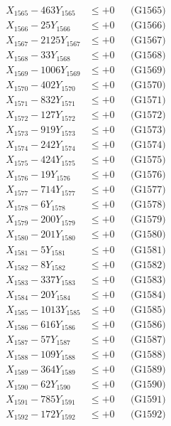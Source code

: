 \documentclass[a4paper,10pt]{article}
\begin{document}
{\begin{align}
X_{1565} - 463Y_{1565} &\leq +0 && \text{(G1565)} \\
X_{1566} - 25Y_{1566} &\leq +0 && \text{(G1566)} \\
X_{1567} - 2125Y_{1567} &\leq +0 && \text{(G1567)} \\
X_{1568} - 33Y_{1568} &\leq +0 && \text{(G1568)} \\
X_{1569} - 1006Y_{1569} &\leq +0 && \text{(G1569)} \\
X_{1570} - 402Y_{1570} &\leq +0 && \text{(G1570)} \\
\allowbreak
X_{1571} - 832Y_{1571} &\leq +0 && \text{(G1571)} \\
X_{1572} - 127Y_{1572} &\leq +0 && \text{(G1572)} \\
X_{1573} - 919Y_{1573} &\leq +0 && \text{(G1573)} \\
X_{1574} - 242Y_{1574} &\leq +0 && \text{(G1574)} \\
X_{1575} - 424Y_{1575} &\leq +0 && \text{(G1575)} \\
X_{1576} - 19Y_{1576} &\leq +0 && \text{(G1576)} \\
X_{1577} - 714Y_{1577} &\leq +0 && \text{(G1577)} \\
X_{1578} - 6Y_{1578} &\leq +0 && \text{(G1578)} \\
X_{1579} - 200Y_{1579} &\leq +0 && \text{(G1579)} \\
X_{1580} - 201Y_{1580} &\leq +0 && \text{(G1580)} \\
\allowbreak
X_{1581} - 5Y_{1581} &\leq +0 && \text{(G1581)} \\
X_{1582} - 8Y_{1582} &\leq +0 && \text{(G1582)} \\
X_{1583} - 337Y_{1583} &\leq +0 && \text{(G1583)} \\
X_{1584} - 20Y_{1584} &\leq +0 && \text{(G1584)} \\
X_{1585} - 1013Y_{1585} &\leq +0 && \text{(G1585)} \\
X_{1586} - 616Y_{1586} &\leq +0 && \text{(G1586)} \\
X_{1587} - 57Y_{1587} &\leq +0 && \text{(G1587)} \\
X_{1588} - 109Y_{1588} &\leq +0 && \text{(G1588)} \\
X_{1589} - 364Y_{1589} &\leq +0 && \text{(G1589)} \\
X_{1590} - 62Y_{1590} &\leq +0 && \text{(G1590)} \\
\allowbreak
X_{1591} - 785Y_{1591} &\leq +0 && \text{(G1591)} \\
X_{1592} - 172Y_{1592} &\leq +0 && \text{(G1592)} \\

\end{align}}
\end{document}
